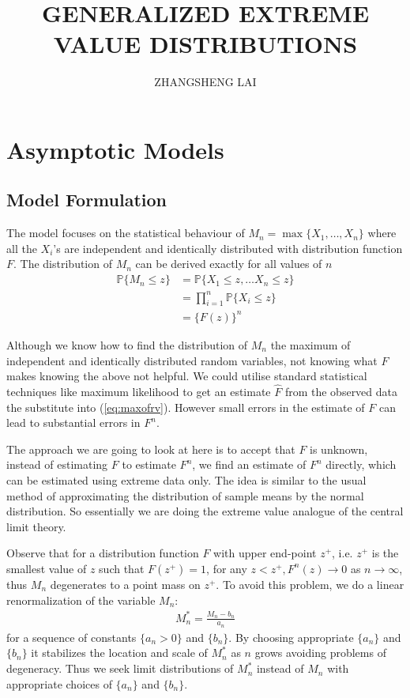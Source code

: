 \documentclass[a4paper,10pt]{article}
\theoremstyle{definition}
\numberwithin{equation}{section}
\begin{document}

\title{\large \bf GENERALIZED EXTREME VALUE DISTRIBUTIONS}
\author{\small ZHANGSHENG LAI}
\date{}
\maketitle

\section{Asymptotic Models}
\subsection{Model Formulation}
The model focuses on the statistical behaviour of $M_n = \max\{X_1,\ldots,X_n\}$ where all the $X_i$'s are independent and identically distributed with distribution function $F$. The distribution of $M_n$ can be derived exactly for all values of $n$
\begin{align}
\mathbb{P}\{M_n\leq z\} &= \mathbb{P}\{X_1\leq z , \ldots X_n \leq z\}\nonumber\\
&= \prod_{i=1}^{n}\mathbb{P}\{X_i\leq z\}\nonumber\\
&=\{F(z)\}^n \label{eq:maxofrv}
\end{align}

Although we know how to find the distribution of $M_n$ the maximum of independent and identically distributed random variables, not knowing what $F$ makes knowing the above not helpful. We could utilise standard statistical techniques like maximum likelihood to get an estimate $\widehat{F}$ from the observed data the substitute into (\ref{eq:maxofrv}). However small errors in the estimate of $F$ can lead to substantial errors in $F^n$.

The approach we are going to look at here is to accept that $F$ is unknown, instead of estimating $F$ to estimate $F^n$, we find an estimate of $F^n$ directly, which can be estimated using extreme data only. The idea is similar to the usual method of approximating the distribution of sample means by the normal distribution. So essentially we are doing the extreme value analogue of the central limit theory.

Observe that for a distribution function $F$ with upper end-point $z^+$, i.e. $z^+$ is the smallest value of $z$ such that $F(z^+) = 1$, for any $z<z^+, F^n(z) \to 0$ as $n \to \infty$, thus $M_n$ degenerates to a point mass on $z^+$. To avoid this problem, we do a linear renormalization of the variable $M_n$:
\begin{align*}
M_n^\ast = \frac{M_n - b_n}{a_n}
\end{align*}
for a sequence of constants $\{a_n>0\}$ and $\{b_n\}$. By choosing appropriate $\{a_n\}$ and $\{b_n\}$ it stabilizes the location and scale of $M_n^\ast$ as $n$ grows avoiding problems of degeneracy. Thus we seek limit distributions of $M_n^\ast$ instead of $M_n$ with appropriate choices of $\{a_n\}$ and $\{b_n\}$.
\end{document}
